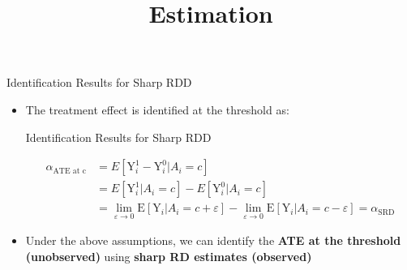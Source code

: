 \documentclass[hyperref={pdfpagelabels=false}]{beamer}
\begin{document}
\begin{frame}{Identification Results for Sharp RDD}{}
	\begin{itemize}
		
		\item The treatment effect is identified at the threshold as:
		\vspace{0.2cm}
		\begin{block}{Identification Results for Sharp RDD}
			
			\begin{equation*}
			\begin{aligned}
			\alpha_{\text{ATE at c}}&=E[\mathrm{Y}^{1}_{i}-\mathrm{Y}^{0}_{i}|A_{i}=c]  \\
			&= E[\mathrm{Y}^{1}_{i}|A_{i}=c]-E[\mathrm{Y}^{0}_{i}|A_{i}=c]\\
			&=\lim_{\varepsilon\rightarrow 0}\mathrm{E}[\mathrm{Y}_{i}|A_i=c+\varepsilon] - \lim_{\varepsilon\rightarrow 0}\mathrm{E}[\mathrm{Y}_{i}|A_i=c-\varepsilon]  = \alpha_{\text{SRD}}
			\end{aligned}
			\end{equation*}
		\end{block}
		
		\vspace{0.2cm}
		\item Under the above assumptions, we can identify the \textbf{ATE at the threshold (unobserved)} using \textbf{sharp RD estimates (observed)}
		
		
		
		
		
	\end{itemize}
\end{frame}










\title[]  
{Estimation}


\author 
{}

\institute{}


\end{document}
